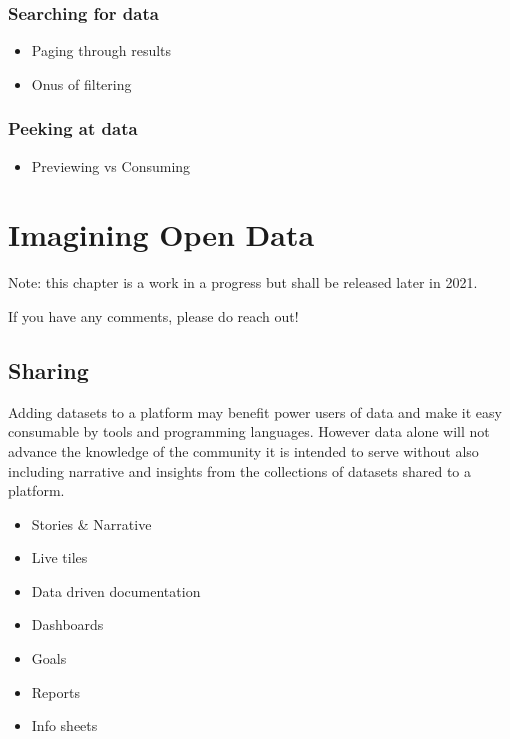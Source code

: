 \documentclass[
  openany]{book}
\providecommand{\tightlist}{%
  \setlength{\itemsep}{0pt}\setlength{\parskip}{0pt}}
\begin{document}
\hypertarget{searching-for-data}{%
\subsection{Searching for data}\label{searching-for-data}}

\begin{itemize}
\tightlist
\item
  Paging through results
\item
  Onus of filtering
\end{itemize}

\hypertarget{peeking-at-data}{%
\subsection{Peeking at data}\label{peeking-at-data}}

\begin{itemize}
\tightlist
\item
  Previewing vs Consuming
\end{itemize}

\hypertarget{imagine}{%
\chapter{Imagining Open Data}\label{imagine}}

Note: this chapter is a work in a progress but shall be released later in 2021.

If you have any comments, please do reach out!

\hypertarget{sharing}{%
\section{Sharing}\label{sharing}}

Adding datasets to a platform may benefit power users of data and make it easy consumable by tools and programming languages. However data alone will not advance the knowledge of the community it is intended to serve without also including narrative and insights from the collections of datasets shared to a platform.

\begin{itemize}
\tightlist
\item
  Stories \& Narrative
\item
  Live tiles
\item
  Data driven documentation
\item
  Dashboards
\item
  Goals
\item
  Reports
\item
  Info sheets
\end{itemize}
\end{document}
